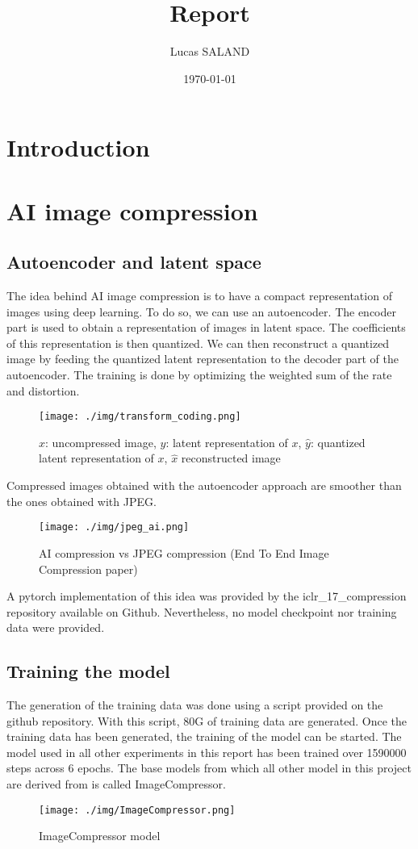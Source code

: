 \documentclass[12pt]{article}
\title{Report}
\author{Lucas SALAND}
\date{\today}
\begin{document}
\section*{Introduction}

\section{AI image compression}
\subsection{Autoencoder and latent space}
The idea behind AI image compression is to have a compact representation of images using deep learning. To do so, we can use an autoencoder. The encoder part is used to obtain a representation of images in latent space. The coefficients of this representation is then quantized. We can then reconstruct a quantized image by feeding the quantized latent representation to the decoder part of the autoencoder. The training is done by optimizing the weighted sum of the rate and distortion.
\begin{figure}[H]
    \centering
    \texttt{[image: ./img/transform\_coding.png]}
    \caption[short]{$x$: uncompressed image, $y$: latent representation of $x$, $\hat{y}$: quantized latent representation of $x$, $\hat{x}$ reconstructed image}
\end{figure}
Compressed images obtained with the autoencoder approach are smoother than the ones obtained with JPEG.
\begin{figure}
    \centering
    \texttt{[image: ./img/jpeg\_ai.png]}
    \caption[short]{AI compression vs JPEG compression (End To End Image Compression paper)}
\end{figure}

A pytorch implementation of this idea was provided by the iclr\_17\_compression repository available on Github. Nevertheless, no model checkpoint nor training data were provided.


\subsection{Training the model}
The generation of the training data was done using a script provided on the github repository. With this script, 80G of training data are generated. Once the training data has been generated, the training of the model can be started. The model used in all other experiments in this report has been trained over 1590000 steps across 6 epochs. The base models from which all other model in this project are derived from is called ImageCompressor.
\begin{figure}[H]
    \centering
    \texttt{[image: ./img/ImageCompressor.png]}
    \caption[short]{ImageCompressor model}
\end{figure}
\end{document}
